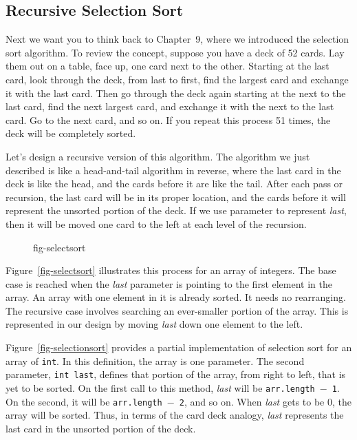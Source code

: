 \subsection{Recursive Selection Sort}
\noindent Next we want you to think back to Chapter~9, where we
introduced the selection sort algorithm. To review the concept,
suppose you have a deck of 52 cards.  Lay them out on a table, face
up, one card next to the other.  Starting at the last card, look
through the deck, from
last to first, find the largest card and exchange it with the last
card.  Then go through the deck again starting at the next to the last
card, find the next largest card, and exchange it with the next to the
last card.  Go to the next card, and so on.  If you repeat this
process 51 times, the deck will be completely sorted.


Let's design a recursive version of this algorithm.  The algorithm we
just described is like a head-and-tail algorithm in reverse, where the
last card in the deck is like the head, and the cards before it are
like the tail.  After each pass or recursion, the last card will be in
its proper location, and the cards before it will represent the
unsorted portion of the deck.  If we use parameter to represent {\it
last}, then it will be moved one card to the left at each level of the
recursion.

\begin{figure}[b]
{fig-selectsort}
\end{figure}

Figure~\ref{fig-selectsort} illustrates this process for an array of
integers.  The base case is reached when the {\it last} parameter is
pointing to the first element in the array.  An array with one element
in it is already sorted.   It needs no rearranging.  The recursive case involves
searching an ever-smaller portion of the array.  This is represented in
our design by moving {\it last} down one element to the left.

Figure~\ref{fig-selectionsort} provides a partial implementation of
selection sort for an array of {\tt int}. In this definition, the
array is one parameter.  The second parameter, {\tt int last}, defines
that portion of the array, from right to left, that is yet to be
sorted.   On the first call to this method, {\it last} will be
{\tt arr.length $-$ 1}.  On the second, it will be {\tt arr.length $-$ 2}, and so
on.  When {\it last} gets to be 0, the array will be sorted.  Thus,
in terms of the card deck analogy, {\it last} represents the last
card in the unsorted portion of the deck.

